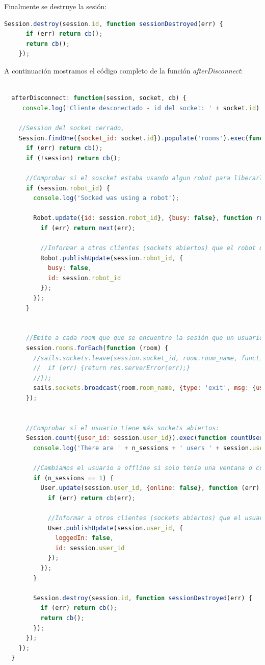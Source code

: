 Finalmente se destruye la sesión:\\

\begin{lstlisting}[language=JavaScript]
    Session.destroy(session.id, function sessionDestroyed(err) {
      if (err) return cb();
      return cb();
    });
\end{lstlisting}


A continuación mostramos el código completo de la función \emph{afterDisconnect}:\\


\begin{lstlisting}[language=JavaScript]

  afterDisconnect: function(session, socket, cb) {
     console.log('Cliente desconectado - id del socket: ' + socket.id);

    //Session del socket cerrado,
    Session.findOne({socket_id: socket.id}).populate('rooms').exec(function (err, session) {
      if (err) return cb();
      if (!session) return cb();

      //Comprobar si el soscket estaba usando algun robot para liberarlo:
      if (session.robot_id) {
        console.log('Socked was using a robot');

        Robot.update({id: session.robot_id}, {busy: false}, function robotUpdated(err) {
          if (err) return next(err);

          //Informar a otros clientes (sockets abiertos) que el robot queda liberado
          Robot.publishUpdate(session.robot_id, {
            busy: false,
            id: session.robot_id
          });
        });
      }


      //Emite a cada room que que se encuentre la sesión que un usuario la ha abandonado ->  
      session.rooms.forEach(function (room) {
        //sails.sockets.leave(session.socket_id, room.room_name, function(err) {
        //  if (err) {return res.serverError(err);}
        //});
        sails.sockets.broadcast(room.room_name, {type: 'exit', msg: {user_id: session.user_id}});
      });


      //Comprobar si el usuario tiene más sockets abiertos:
      Session.count({user_id: session.user_id}).exec(function countUserSessions(error, n_sessions) {
        console.log('There are ' + n_sessions + ' users ' + session.user_id);

        //Cambiamos el usuario a offline si solo tenía una ventana o conexión abierta.
        if (n_sessions == 1) {
          User.update(session.user_id, {online: false}, function (err) {
            if (err) return cb(err);

            //Informar a otros clientes (sockets abiertos) que el usuario ya NO se encuentra logueado
            User.publishUpdate(session.user_id, {
              loggedIn: false,
              id: session.user_id
            });
          });
        }

        Session.destroy(session.id, function sessionDestroyed(err) {
          if (err) return cb();
          return cb();
        });
      });
    });
  }

\end{lstlisting}
 